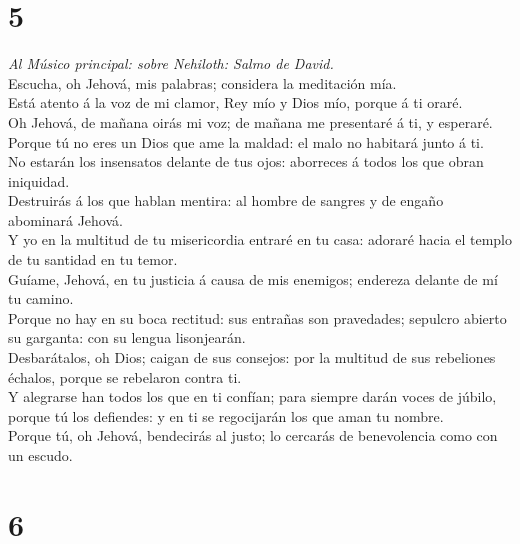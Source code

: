 \hypertarget{section-4}{%
\section{5}\label{section-4}}

 \emph{Al Músico principal: sobre Nehiloth: Salmo de
David.}\\
Escucha, oh Jehová, mis palabras; considera la meditación mía.\\
 Está atento á la voz de mi clamor, Rey mío y Dios mío,
porque á ti oraré.\\
 Oh Jehová, de mañana oirás mi voz; de mañana me presentaré
á ti, y esperaré.\\
 Porque tú no eres un Dios que ame la maldad: el malo no
habitará junto á ti.\\
 No estarán los insensatos delante de tus ojos: aborreces á
todos los que obran iniquidad.\\
 Destruirás á los que hablan mentira: al hombre de sangres y
de engaño abominará Jehová.\\
 Y yo en la multitud de tu misericordia entraré en tu casa:
adoraré hacia el templo de tu santidad en tu temor.\\
 Guíame, Jehová, en tu justicia á causa de mis enemigos;
endereza delante de mí tu camino.\\
 Porque no hay en su boca rectitud: sus entrañas son
pravedades; sepulcro abierto su garganta: con su lengua lisonjearán.\\
 Desbarátalos, oh Dios; caigan de sus consejos: por la
multitud de sus rebeliones échalos, porque se rebelaron contra ti.\\
 Y alegrarse han todos los que en ti confían; para siempre
darán voces de júbilo, porque tú los defiendes: y en ti se regocijarán
los que aman tu nombre.\\
 Porque tú, oh Jehová, bendecirás al justo; lo cercarás de
benevolencia como con un escudo.

\hypertarget{section-5}{%
\section{6}\label{section-5}}


